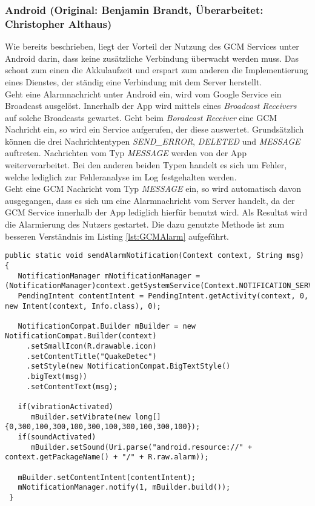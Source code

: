 \subsubsection{Android    (Original: Benjamin Brandt, Überarbeitet: Christopher Althaus)}
Wie bereits beschrieben, liegt der Vorteil der Nutzung des GCM Services unter Android darin, dass keine zusätzliche Verbindung überwacht werden muss. Das schont zum einen die Akkulaufzeit und erspart zum anderen die Implementierung eines Dienstes, der ständig eine Verbindung mit dem Server herstellt.\\
Geht eine Alarmnachricht unter Android ein, wird vom Google Service ein Broadcast ausgelöst. Innerhalb der App wird mittels eines \textit{Broadcast Receivers} auf solche Broadcasts gewartet. Geht beim \textit{Boradcast Receiver} eine GCM Nachricht ein, so wird ein Service aufgerufen, der diese auswertet. Grundsätzlich können die drei Nachrichtentypen \textit{SEND\_ERROR}, \textit{DELETED} und \textit{MESSAGE} auftreten. Nachrichten vom Typ \textit{MESSAGE} werden von der App weiterverarbeitet. Bei den anderen beiden Typen handelt es sich um Fehler, welche lediglich zur Fehleranalyse im Log festgehalten werden.\\
Geht eine GCM Nachricht vom Typ \textit{MESSAGE} ein, so wird automatisch davon ausgegangen, dass es sich um eine Alarmnachricht vom Server handelt, da der GCM Service innerhalb der App lediglich hierfür benutzt wird. Als Resultat wird die Alarmierung des Nutzers gestartet. Die dazu genutzte Methode ist zum besseren Verständnis im Listing \ref{lst:GCMAlarm} aufgeführt.
\begin{lstlisting}[caption={Senden von Nachrichten vom Server},label=lst:GCMAlarm]
 public static void sendAlarmNotification(Context context, String msg) {
   NotificationManager mNotificationManager = (NotificationManager)context.getSystemService(Context.NOTIFICATION_SERVICE);
   PendingIntent contentIntent = PendingIntent.getActivity(context, 0, new Intent(context, Info.class), 0);

   NotificationCompat.Builder mBuilder = new NotificationCompat.Builder(context)
     .setSmallIcon(R.drawable.icon)
     .setContentTitle("QuakeDetec")
     .setStyle(new NotificationCompat.BigTextStyle()
     .bigText(msg))
     .setContentText(msg);
     
   if(vibrationActivated)
      mBuilder.setVibrate(new long[]{0,300,100,300,100,300,100,300,100,300,100});
   if(soundActivated)
      mBuilder.setSound(Uri.parse("android.resource://" + context.getPackageName() + "/" + R.raw.alarm));
	
   mBuilder.setContentIntent(contentIntent);
   mNotificationManager.notify(1, mBuilder.build());     
 }
\end{lstlisting}

